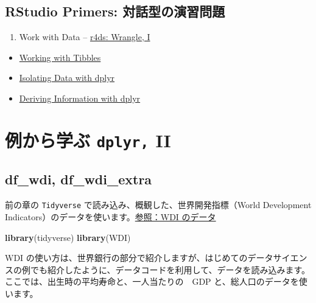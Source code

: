 \documentclass[
  xelatex, ja=standard]{bxjsbook}
\newenvironment{Shaded}{\begin{snugshade}}{\end{snugshade}}
\newcommand{\FunctionTok}[1]{\textcolor[rgb]{0.13,0.29,0.53}{\textbf{#1}}}
\newcommand{\NormalTok}[1]{#1}
\providecommand{\tightlist}{%
  \setlength{\itemsep}{0pt}\setlength{\parskip}{0pt}}
\theoremstyle{definition}
\theoremstyle{definition}
\theoremstyle{definition}
\theoremstyle{definition}
\theoremstyle{remark}
\begin{document}
\hypertarget{rstudio-primers-ux5bfeux8a71ux578bux306eux6f14ux7fd2ux554fux984c}{%
\subsection{RStudio Primers: 対話型の演習問題}\label{rstudio-primers-ux5bfeux8a71ux578bux306eux6f14ux7fd2ux554fux984c}}

\begin{enumerate}
\def\labelenumi{\arabic{enumi}.}
\setcounter{enumi}{1}
\tightlist
\item
  Work with Data -- \href{https://r4ds.had.co.nz/wrangle-intro.html\#wrangle-intro}{r4ds: Wrangle, I}
\end{enumerate}

\begin{itemize}
\tightlist
\item
  \href{https://rstudio.cloud/learn/primers/2.1}{Working with Tibbles}
\item
  \href{https://rstudio.cloud/learn/primers/2.2}{Isolating Data with dplyr}
\item
  \href{https://rstudio.cloud/learn/primers/2.3}{Deriving Information with dplyr}
\end{itemize}

\hypertarget{ux4f8bux304bux3089ux5b66ux3076-dplyr-ii}{%
\section{\texorpdfstring{例から学ぶ \texttt{dplyr,} II}{例から学ぶ dplyr, II}}\label{ux4f8bux304bux3089ux5b66ux3076-dplyr-ii}}

\hypertarget{df_wdi-df_wdi_extra}{%
\subsection{df\_wdi, df\_wdi\_extra}\label{df_wdi-df_wdi_extra}}

前の章の \texttt{Tidyverse} で読み込み、概観した、世界開発指標（World Development Indicators）のデータを使います。\href{https://icu-hsuzuki.github.io/ds4aj/tidyverse.html\#wdi-のデータ}{参照：WDI のデータ}

\begin{Shaded}
\begin{Highlighting}[]
\FunctionTok{library}\NormalTok{(tidyverse)}
\FunctionTok{library}\NormalTok{(WDI)}
\end{Highlighting}
\end{Shaded}

WDI の使い方は、世界銀行の部分で紹介しますが、はじめてのデータサイエンスの例でも紹介したように、データコードを利用して、データを読み込みます。ここでは、出生時の平均寿命と、一人当たりの　GDP と、総人口のデータを使います。
\end{document}
